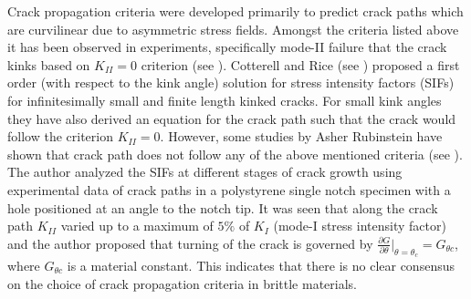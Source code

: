\documentclass[11pt] {article}
\begin{document}
Crack propagation criteria were developed primarily to predict crack paths which are curvilinear due to asymmetric stress fields. Amongst the criteria listed above it has been observed in experiments, specifically mode-II failure that the crack kinks based on $K_{II} = 0$ criterion (see \cite{buzzard_1986,smith_1972}). Cotterell and Rice (see \cite{cotterell_1980}) proposed a first order (with respect to the kink angle) solution for stress intensity factors (SIFs) for infinitesimally small and finite length kinked cracks. For small kink angles they have also derived an equation for the crack path such that the crack would follow the criterion $K_{II} = 0$. However, some studies by Asher Rubinstein have shown that crack path does not follow any of the above mentioned criteria (see \cite{rubinstein_1991}). The author analyzed the SIFs at different stages of crack growth using experimental data of crack paths in a polystyrene single notch specimen with a hole positioned at an angle to the notch tip. It was seen that along the crack path $K_{II}$ varied up to a maximum of $5\%$ of $K_I$ (mode-I stress intensity factor) and the author proposed that turning of the crack is governed by $\frac{\partial G}{\partial \theta}\big|_{\theta = \theta_c} = G_{\theta c}$, where $G_{\theta c}$ is a material constant. This indicates that there is no clear consensus on the choice of crack propagation criteria in brittle materials.
\end{document}

